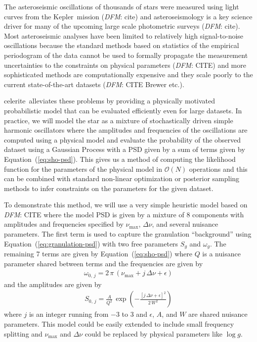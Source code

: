 \documentclass[manuscript, letterpaper]{aastex6}
\newcommand{\project}[1]{\textsf{#1}}
\newcommand{\kepler}{\project{Kepler}}
\newcommand{\celerite}{\project{celerite}}
\renewcommand{\eqref}[1]{\ref{eq:#1}}
\newcommand{\Eq}[1]{Equation~(\eqref{#1})}
\newcommand{\eq}[1]{\Eq{#1}}
\newcommand{\todo}[3]{{\color{#2}\emph{#1}: #3}}
\newcommand{\dfmtodo}[1]{\todo{DFM}{red}{#1}}
\begin{document}
The asteroseismic oscillations of thousands of stars were measured using light
curves from the \kepler\ mission (\dfmtodo{cite}) and asteroseismology is a
key science driver for many of the upcoming large scale photometric surveys
(\dfmtodo{cite}).
Most asteroseismic analyses have been limited to relatively high
signal-to-noise oscillations because the standard methods based on statistics
of the empirical periodogram of the data cannot be used to formally propagate
the measurement uncertainties to the constraints on physical parameters
(\dfmtodo{CITE}) and more sophisticated methods are computationally expensive
and they scale poorly to the current state-of-the-art datasets (\dfmtodo{CITE
Brewer etc.}).

\celerite\ alleviates these problems by providing a physically motivated
probabilistic model that can be evaluated efficiently even for large datasets.
In practice, we will model the star as a mixture of stochastically driven
simple harmonic oscillators where the amplitudes and frequencies of the
oscillations are computed using a physical model and evaluate the probability
of the observed dataset using a Gaussian Process with a PSD given by a sum of
terms given by \eq{sho-psd}.
This gives us a method of computing the likelihood function for the parameters
of the physical model in $\mathcal{O}(N)$ operations and this can be combined
with standard non-linear optimization or posterior sampling methods to infer
constraints on the parameters for the given dataset.

To demonstrate this method, we will use a very simple heuristic model based on
\dfmtodo{CITE} where the model PSD is given by a mixture of 8 components with
amplitudes and frequencies specified by $\nu_\mathrm{max}$, $\Delta \nu$, and
several nuisance parameters.
The first term is used to capture the granulation ``background'' using
\eq{granulation-psd} with two free parameters $S_g$ and $\omega_g$.
The remaining  7 terms are given by \eq{sho-psd} where $Q$ is a nuisance
parameter shared between terms and the frequencies are given by
\begin{eqnarray}
\omega_{0,\,j} = 2\,\pi\,(\nu_\mathrm{max} + j\,\Delta\nu + \epsilon)
\end{eqnarray}
and the amplitudes are given by
\begin{eqnarray}
S_{0,\,j} =
    \frac{A}{Q^2}\,\exp\left(-\frac{[j\,\Delta\nu + \epsilon]^2}{2\,W^2}\right)
\end{eqnarray}
where $j$ is an integer running from $-3$ to 3 and $\epsilon$, $A$, and $W$
are shared nuisance parameters.
This model could be easily extended to include small frequency splitting and
$\nu_\mathrm{max}$ and $\Delta \nu$ could be replaced by physical parameters
like $\log g$.
\end{document}
